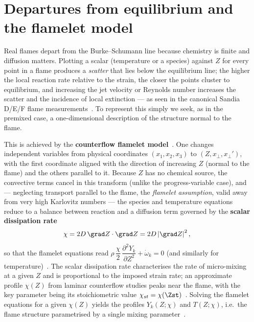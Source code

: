 \section{Departures from equilibrium and the flamelet model}

Real flames depart from the Burke--Schumann line because chemistry is finite and diffusion matters. Plotting a scalar (temperature or a species) against $Z$ for every point in a flame produces a \emph{scatter} that lies below the equilibrium line; the higher the local reaction rate relative to the strain, the closer the points cluster to equilibrium, and increasing the jet velocity or Reynolds number increases the scatter and the incidence of local extinction --- as seen in the canonical Sandia D/E/F flame measurements~\cite{lecture9}. To represent this simply we seek, as in the premixed case, a one-dimensional description of the structure normal to the flame.

This is achieved by the \textbf{counterflow flamelet model}~\cite{lecture9,peters2000turbulent}. One changes independent variables from physical coordinates $(x_1,x_2,x_3)$ to $(Z,x_\perp,x_\perp')$, with the first coordinate aligned with the direction of increasing $Z$ (normal to the flame) and the others parallel to it. Because $Z$ has no chemical source, the convective terms cancel in this transform (unlike the progress-variable case), and --- neglecting transport parallel to the flame, the \emph{flamelet assumption}, valid away from very high Karlovitz numbers --- the species and temperature equations reduce to a balance between reaction and a diffusion term governed by the \textbf{scalar dissipation rate}
\begin{equation}
\chi=2D\,\grad Z\cdot\grad Z=2D\left|\grad Z\right|^2 ,
\label{eq:chi}
\end{equation}
so that the flamelet equations read $\rho\,\dfrac{\chi}{2}\,\dfrac{\partial^2 Y_k}{\partial Z^2}+\dot\omega_k=0$ (and similarly for temperature)~\cite{lecture9}. The scalar dissipation rate characterises the rate of micro-mixing at a given $Z$ and is proportional to the imposed strain rate; an approximate profile $\chi(Z)$ from laminar counterflow studies peaks near the flame, with the key parameter being its stoichiometric value $\chi_{st}=\chi(\Zst)$~\cite{lecture9,poinsot2011theoretical}. Solving the flamelet equations for a given $\chi(Z)$ yields the profiles $Y_k(Z;\chi)$ and $T(Z;\chi)$, i.e.\ the flame structure parametrised by a single mixing parameter~\cite{lecture9}.

